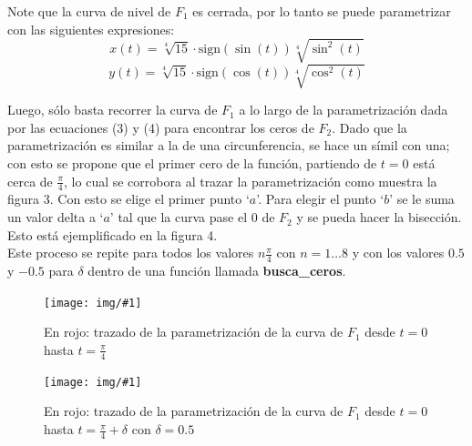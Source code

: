 \documentclass[a4paper, 11pt, spanish]{article}
\newcommand{\fig}[4]{%
	\begin{figure}[!ht]
		\centering
		\texttt{[image: img/\#1]}
		\caption{#4}
	\end{figure}
}
\begin{document}
Note que la curva de nivel de $F_{1}$ es cerrada, por lo tanto se puede parametrizar con las siguientes expresiones:
\begin{equation}
	x(t) = \sqrt[4]{15}\cdot\text{sign}(\sin(t))\sqrt[4]{\sin^{2}(t)}
\end{equation}
\begin{equation}
	y(t) = \sqrt[4]{15}\cdot\text{sign}(\cos(t))\sqrt[4]{\cos^{2}(t)}
\end{equation}

Luego, s\'olo basta recorrer la curva de $F_{1}$ a lo largo de la parametrizaci\'on dada por las ecuaciones (3) y (4) para encontrar los ceros de $F_{2}$. Dado que la parametrizaci\'on es similar a la de una circunferencia, se hace un s\'imil con una; con esto se propone que el primer cero de la funci\'on, partiendo de $t=0$ est\'a cerca de $\frac{\pi}{4}$, lo cual se corrobora al trazar la parametrizaci\'on como muestra la figura 3. Con esto se elige el primer punto `$a$'. Para elegir el punto `$b$' se le suma un valor delta a `$a$' tal que la curva pase el $0$ de $F_{2}$ y se pueda hacer la bisecci\'on. Esto est\'a ejemplificado en la figura 4. \\ Este proceso se repite para todos los valores $n\frac{\pi}{4}$ con $n = 1\ldots 8$ y con los valores $0.5$ y $-0.5$ para $\delta$ dentro de una funci\'on llamada \textbf{busca\_ceros}.

\fig{contour1.pdf}{15cm}{8cm}{En rojo: trazado de la parametrizaci\'on de la curva de $F_{1}$ desde $t=0$ hasta $t=\frac{\pi}{4}$}
\fig{pi4eps.pdf}{15cm}{8cm}{En rojo: trazado de la parametrizaci\'on de la curva de $F_{1}$ desde $t=0$ hasta $t=\frac{\pi}{4}+\delta$ con $\delta = 0.5$}

\newpage
\end{document}
